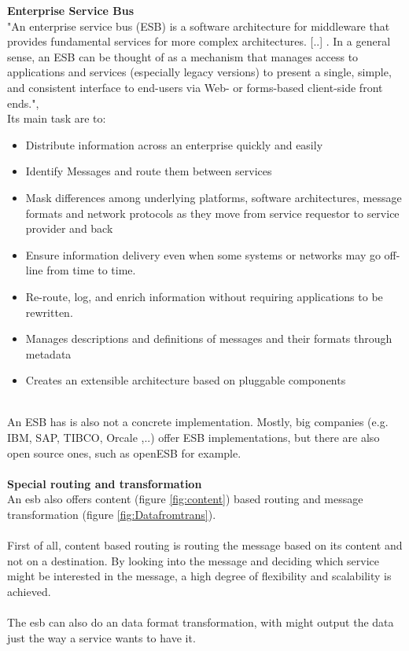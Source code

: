 \documentclass[12pt]{article}
\begin{document}
\FloatBarrier  \noindent
\textbf{Enterprise Service Bus} \\
"An enterprise service bus (ESB) is a software architecture for middleware that provides fundamental services for more complex architectures. [..] . In a general sense, an ESB can be thought of as a mechanism that manages access to applications and services (especially legacy versions) to present a single, simple, and consistent interface to end-users via Web- or forms-based client-side front ends.", \cite{esbdef}\\
Its main task are to:
\begin{itemize}
\item Distribute information across an enterprise quickly and easily
\item Identify Messages and route them between services
\item Mask differences among underlying platforms, software architectures, message formats and network protocols as they move from service requestor to service provider and back
\item Ensure information delivery even when some systems or networks may go off-line from time to time.
\item Re-route, log, and enrich information without requiring applications to be rewritten.
\item Manages descriptions and definitions of messages and their formats through metadata
\item Creates an extensible architecture based on pluggable components
\end{itemize} \cite{esbdef,esbimplpatt} \\
An ESB has is also not a concrete implementation. Mostly, big companies (e.g. IBM, SAP, TIBCO, Orcale ,..) offer ESB implementations, but there are also open source ones, such as openESB for example.
\\\\
\textbf{Special routing and transformation} \\
An \gls{esb} also offers content (figure \ref{fig:content}) %
based  routing and message transformation (figure \ref{fig:Datafromtrans}).\\\\
First of all, content based routing is routing the message based on its content and not on a destination. By looking into the message and deciding which service might be interested in the message, a high degree of flexibility and scalability is achieved.\\ %
\\The esb can also do an data format transformation, with might output the data just the way a service wants to have it.
\end{document}
